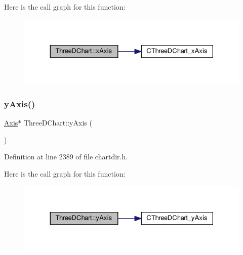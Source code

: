 Here is the call graph for this function\+:
\nopagebreak
\begin{figure}[H]
\begin{center}
\leavevmode
\includegraphics[width=330pt]{class_three_d_chart_a60544422121d19e5fdcf57de931cd123_cgraph}
\end{center}
\end{figure}
\mbox{\label{class_three_d_chart_a3b2b3f30cdd1a79a0bb7712c36c77fa7}} 
\subsubsection{\texorpdfstring{y\+Axis()}{yAxis()}}
{\footnotesize\ttfamily \hyperlink{class_axis}{Axis}$\ast$ Three\+D\+Chart\+::y\+Axis (\begin{DoxyParamCaption}{ }\end{DoxyParamCaption})\hspace{0.3cm}{\ttfamily [inline]}}



Definition at line 2389 of file chartdir.\+h.

Here is the call graph for this function\+:
\nopagebreak
\begin{figure}[H]
\begin{center}
\leavevmode
\includegraphics[width=330pt]{class_three_d_chart_a3b2b3f30cdd1a79a0bb7712c36c77fa7_cgraph}
\end{center}
\end{figure}
\mbox{\label{class_three_d_chart_a94da9716d472e2221f6f17a4ed30fa00}} 
